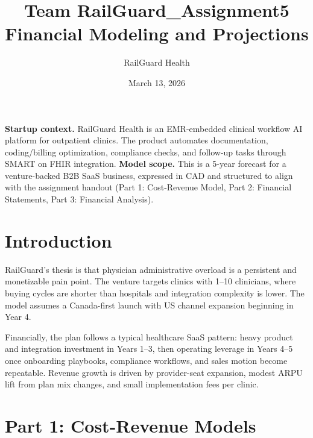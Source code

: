 \documentclass[11pt]{article}
\title{Team RailGuard\_Assignment5\\Financial Modeling and Projections}
\author{RailGuard Health}
\date{March 13, 2026}
\begin{document}
\maketitle

\noindent\textbf{Startup context.} RailGuard Health is an EMR-embedded clinical workflow AI platform for outpatient clinics. The product automates documentation, coding/billing optimization, compliance checks, and follow-up tasks through SMART on FHIR integration.  
\textbf{Model scope.} This is a 5-year forecast for a venture-backed B2B SaaS business, expressed in CAD and structured to align with the assignment handout (Part 1: Cost-Revenue Model, Part 2: Financial Statements, Part 3: Financial Analysis).

\section*{Introduction}
RailGuard's thesis is that physician administrative overload is a persistent and monetizable pain point. The venture targets clinics with 1--10 clinicians, where buying cycles are shorter than hospitals and integration complexity is lower. The model assumes a Canada-first launch with US channel expansion beginning in Year 4.

Financially, the plan follows a typical healthcare SaaS pattern: heavy product and integration investment in Years 1--3, then operating leverage in Years 4--5 once onboarding playbooks, compliance workflows, and sales motion become repeatable. Revenue growth is driven by provider-seat expansion, modest ARPU lift from plan mix changes, and small implementation fees per clinic.

\section*{Part 1: Cost-Revenue Models}
\end{document}
